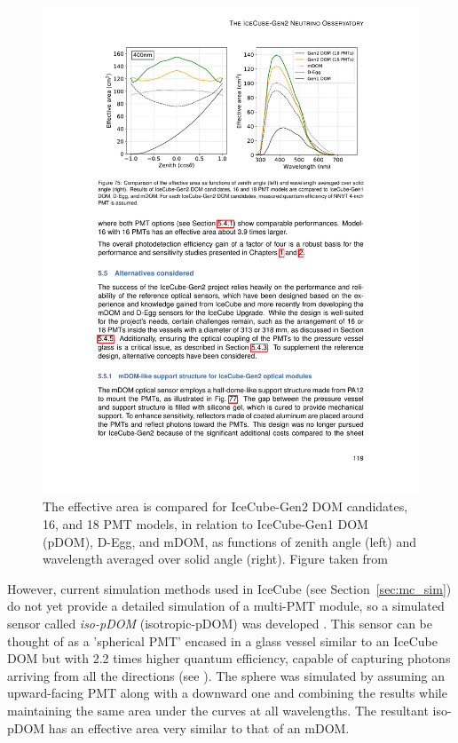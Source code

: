 \begin{figure}
    \includegraphics{./figures/gen2/EffectiveAreaCurve_TDR.pdf}
    \caption{The effective area is compared for IceCube-Gen2 DOM candidates, 16, and 18 PMT models, in relation to IceCube-Gen1 DOM (pDOM), D-Egg, and mDOM, as functions of zenith angle (left) and wavelength averaged over solid angle (right). Figure taken from \cite{Gen2_TDR}} 
\end{figure}

However, current simulation methods used in IceCube (see Section~\ref{sec:mc_sim}) do not yet provide a detailed simulation of a multi-PMT module, so a simulated sensor called \emph{iso-pDOM} (isotropic-pDOM) was developed . This sensor can be thought of as a 'spherical PMT' encased in a glass vessel similar to an IceCube DOM but with 2.2 times higher quantum efficiency, capable of capturing photons arriving from all the directions (see ). The sphere was simulated by assuming an upward-facing PMT along with a downward one and combining the results while maintaining the same area under the curves at all wavelengths. The resultant iso-pDOM has an effective area very similar to that of an mDOM.

